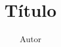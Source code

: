 \documentclass{beamer}
\title[Instituto de Automática (INAUT)]{ Título }
\author[Autor abreviado]{Autor}
\institute[UNSJ]{Universidad Nacional de San Juan\\
Instituto de Automática\\ 
	\url{ autor@inaut.unsj.edu.ar }\\
}
\date{} %
\begin{document}
\justifying
\begin{frame}
\titlepage 
\end{frame}
\end{document}
